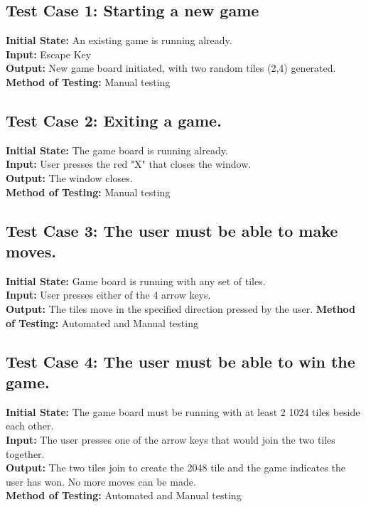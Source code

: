 \documentclass[12pt]{article}
\begin{document}
\subsection{Test Case 1: Starting a new game}

\textbf{Initial State:} An existing game is running already. \\
\textbf{Input:} Escape Key\\
\textbf{Output:} New game board initiated, with two random tiles (2,4) generated.
\textbf{Method of Testing:} Manual testing

\subsection{Test Case 2: Exiting a game.}

\textbf{Initial State:} The game board is running already.\\
\textbf{Input:} User presses the red "X" that closes the window.\\
\textbf{Output:} The window closes. \\
\textbf{Method of Testing:} Manual testing

\subsection{Test Case 3: The user must be able to make moves.}

\textbf{Initial State:} Game board is running with any set of tiles.\\
\textbf{Input:} User presses either of the 4 arrow keys.\\
\textbf{Output:} The tiles move in the specified direction pressed by the user.
\textbf{Method of Testing:} Automated and Manual testing

\subsection{Test Case 4: The user must be able to win the game.}

\textbf{Initial State:} The game board must be running with at least 2 1024 tiles beside
each other.\\
\textbf{Input:} The user presses one of the arrow keys that would join the two tiles
together.\\
\textbf{Output:} The two tiles join to create the 2048 tile and the game indicates the
user has won. No more moves can be made.\\
\textbf{Method of Testing:} Automated and Manual testing
\end{document}
